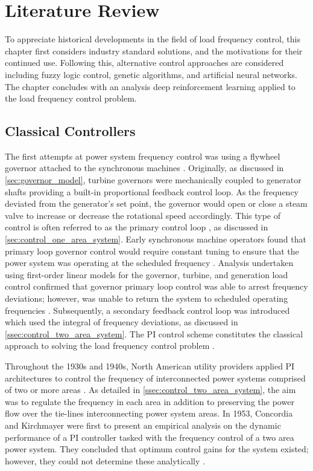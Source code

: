 \chapter{Literature Review}
To appreciate historical developments in the field of load frequency control, this chapter first considers industry standard solutions, and the motivations for their continued use. Following this, alternative control approaches are considered including fuzzy logic control, genetic algorithms, and artificial neural networks. The chapter concludes with an analysis deep reinforcement learning applied to the load frequency control problem.

\section{Classical Controllers}\label{agc}
The first attempts at power system frequency control was using a flywheel governor attached to the synchronous machines \cite{Prabhat2005}. Originally, as discussed in \textsection \ref{sec:governor_model}, turbine governors were mechanically coupled to generator shafts providing a built-in proportional feedback control loop. As the frequency deviated from the generator's set point, the governor would open or close a steam valve to increase or decrease the rotational speed accordingly. This type of control is often referred to as the primary control loop \cite{Bevrani2011}, as discussed in \textsection \ref{sec:control_one_area_system}. Early synchronous machine operators found that primary loop governor control would require constant tuning to ensure that the power system was operating at the scheduled frequency \cite{Cohn1983}. Analysis undertaken using first-order linear models for the governor, turbine, and generation load control confirmed that governor primary loop control was able to arrest frequency deviations; however, was unable to return the system to scheduled operating frequencies \cite{Saadat2011}. Subsequently, a secondary feedback control loop was introduced which used the integral of frequency deviations, as discussed in \textsection \ref{ssec:control_two_area_system}. The PI control scheme constitutes the classical approach to solving the load frequency control problem \cite{Prabhat2005}.

Throughout the 1930s and 1940s, North American utility providers applied PI architectures to control the frequency of interconnected power systems comprised of two or more areas \cite{Cohn1983}. As detailed in \textsection \ref{ssec:control_two_area_system}, the aim was to regulate the frequency in each area in addition to preserving the power flow over the tie-lines interconnecting power system areas. In 1953, Concordia and Kirchmayer were first to present an empirical analysis on the dynamic performance of a PI controller tasked with the frequency control of a two area power system. They concluded that optimum control gains for the system existed; however, they could not determine these analytically \cite{Concordia1953}.

